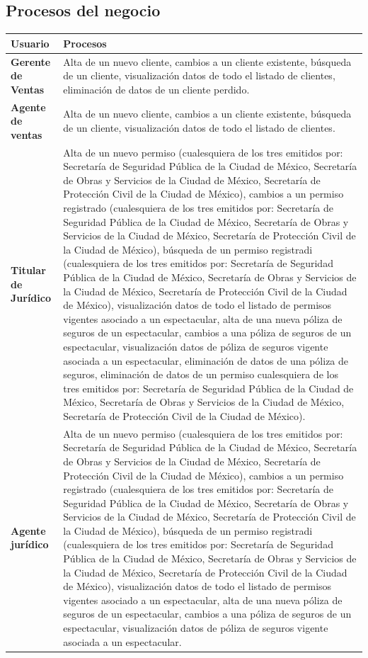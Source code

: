 \documentclass[12pt]{article}
\begin{document}
\subsection{Procesos del negocio}
\begin{longtable}[H]{m{4cm}m{8cm}}
    \toprule
    
    \centering \textbf{Usuario} & \centering  \textbf{Procesos} \tabularnewline
    \midrule
    \textbf{Gerente de Ventas} & Alta de un nuevo cliente, cambios a un cliente existente, búsqueda de un cliente, visualización datos de todo el listado de clientes, eliminación de datos de un cliente perdido.\tabularnewline
    \textbf{Agente de ventas} & Alta de un nuevo cliente, cambios a un cliente existente, búsqueda de un cliente, visualización datos de todo el listado de clientes.\tabularnewline
    \textbf{Titular de Jurídico} & Alta de un nuevo permiso (cualesquiera de los tres emitidos por: Secretaría de Seguridad Pública de la Ciudad de México, Secretaría de Obras y Servicios de la Ciudad de México, Secretaría de Protección Civil de la Ciudad de México), cambios a un permiso registrado (cualesquiera de los tres emitidos por: Secretaría de Seguridad Pública de la Ciudad de México, Secretaría de Obras y Servicios de la Ciudad de México, Secretaría de Protección Civil de la Ciudad de México), búsqueda de un permiso registradi (cualesquiera de los tres emitidos por: Secretaría de Seguridad Pública de la Ciudad de México, Secretaría de Obras y Servicios de la Ciudad de México, Secretaría de Protección Civil de la Ciudad de México), visualización datos de todo el listado de permisos vigentes asociado a un espectacular, alta de una nueva póliza de seguros de un espectacular, cambios  a una póliza de seguros de un espectacular,  visualización datos de póliza de seguros vigente asociada a un espectacular, eliminación de datos de una póliza de seguros, eliminación de datos de un permiso cualesquiera de los tres emitidos por: Secretaría de Seguridad Pública de la Ciudad de México, Secretaría de Obras y Servicios de la Ciudad de México, Secretaría de Protección Civil de la Ciudad de México).\tabularnewline
    \textbf{Agente jurídico} & Alta de un nuevo permiso (cualesquiera de los tres emitidos por: Secretaría de Seguridad Pública de la Ciudad de México, Secretaría de Obras y Servicios de la Ciudad de México, Secretaría de Protección Civil de la Ciudad de México), cambios a un permiso registrado (cualesquiera de los tres emitidos por: Secretaría de Seguridad Pública de la Ciudad de México, Secretaría de Obras y Servicios de la Ciudad de México, Secretaría de Protección Civil de la Ciudad de México), búsqueda de un permiso registradi (cualesquiera de los tres emitidos por: Secretaría de Seguridad Pública de la Ciudad de México, Secretaría de Obras y Servicios de la Ciudad de México, Secretaría de Protección Civil de la Ciudad de México), visualización datos de todo el listado de permisos vigentes asociado a un espectacular, alta de una nueva póliza de seguros de un espectacular, cambios  a una póliza de seguros de un espectacular,  visualización datos de póliza de seguros vigente asociada a un espectacular.\tabularnewline

\end{longtable}
\end{document}
